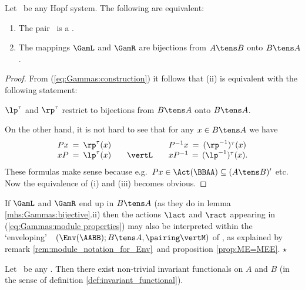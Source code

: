 \begin{lemma_sec}  \label{mhs:Gammas:bijective}
Let\/ \pairAB\ be any Hopf system. The following are equivalent:
\begin{enumerate}
\item The pair\/ \pairAB\ is a \mhs.
\item The mappings\/ $\GamL$ and\/ $\GamR$ are bijections from\/ $A\tens B$ onto\/ $B \tens A$.
\end{enumerate}
\end{lemma_sec}
\begin{proof}
From (\ref{eq:Gammas:construction}) it follows that (ii) is equivalent
with the following statement:
\begin{enumerate}
{\em \item[iii.] $\lp^\tau$ and\/ $\rp^\tau$ restrict to bijections from\/ $B\tens A$
                    onto\/ $B \tens A$.}
\end{enumerate}
On the other hand, it is not hard to see that for any $x \in B\tens A$ we have
$$ \begin{array}{lcl}
   Px  \:=\:  \rp^\tau(x)   & \hspace{5em} &  P^{-1} x  \:=\:  (\rp^{-1})^\tau(x) \\
   xP  \:=\:  \lp^\tau(x)   & \vertL &  x P^{-1}  \,=\, (\lp^{-1})^\tau(x).
   \end{array} $$
These formulas make sense because e.g.\ $Px \in \Act(\BBAA) \subseteq (A \tens B)'$ etc.
Now the equivalence of (i) and (iii) becomes obvious.
\end{proof}


\begin{remark_sec} \rm
If $\GamL$ and $\GamR$ end up in $B \tens A$
(as they do in lemma \ref{mhs:Gammas:bijective}.ii)
then the actions $\lact$ and $\ract$ appearing in (\ref{eq:Gammas:module properties})
may also be interpreted within the
\lq enveloping\rq\ \context\ $\left(\Env(\AABB); B\tens A, \pairing \vertM\right)$
of \AABB, as explained by remark \ref{rem:module_notation_for_Env}\ and proposition \ref{prop:ME=MEE}.
\hfill $\star$
\end{remark_sec}


\begin{prop_sec} \label{prop:existence:invariant_functionals}
Let\/ \pairAB\ be any \mhs\@.
Then there exist non-trivial invariant functionals on $A$ and\/ $B$
(in the sense of definition \ref{def:invariant_functional}).
\end{prop_sec}


